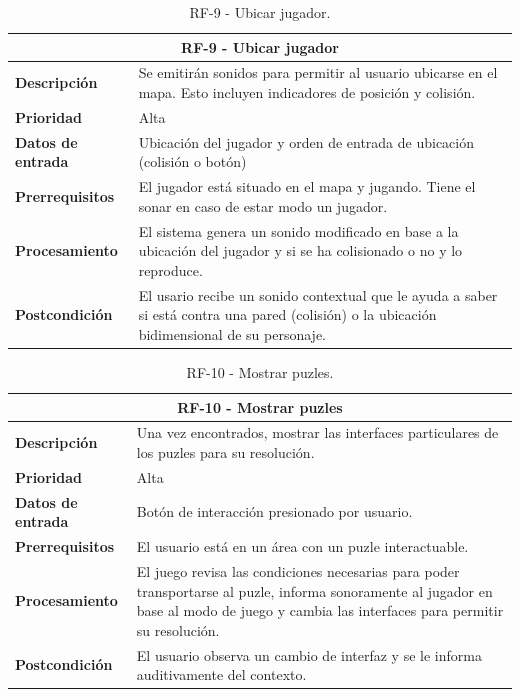 \begin{table}[H]
	\centering
	\caption{RF-9 - Ubicar jugador.}
	\label{table:RF9}
	\begin{tabular}{|l|p{10cm}|}
		\hline
		\multicolumn{2}{|c|}{\textbf{RF-9 - Ubicar jugador}} \\
		\hline
		\textbf{Descripción} &  Se emitirán sonidos para permitir al usuario ubicarse en el mapa. Esto incluyen indicadores de posición y colisión.  \\
		\hline
		\textbf{Prioridad} & Alta \\
		\hline
		\textbf{Datos de entrada} & Ubicación del jugador y orden de entrada de ubicación (colisión o botón) \\
		\hline
		\textbf{Prerrequisitos} & El jugador está situado en el mapa y jugando. Tiene el sonar en caso de estar modo un jugador. \\
		\hline
		\textbf{Procesamiento} & El sistema genera un sonido modificado en base a la ubicación del jugador y si se ha colisionado o no y lo reproduce. \\
		\hline
		\textbf{Postcondición} & El usario recibe un sonido contextual que le ayuda a saber si está contra una pared (colisión) o la ubicación bidimensional de su personaje. \\
		\hline
	\end{tabular}
	
\end{table}
\begin{table}[H]
	\centering
	\caption{RF-10 - Mostrar puzles.}
	\label{table:RF10}
	\begin{tabular}{|l|p{10cm}|}
		\hline
		\multicolumn{2}{|c|}{\textbf{RF-10 - Mostrar puzles}} \\
		\hline
		\textbf{Descripción} & Una vez encontrados, mostrar las interfaces particulares de los puzles para su resolución. \\
		\hline
		\textbf{Prioridad} & Alta \\
		\hline
		\textbf{Datos de entrada} & Botón de interacción presionado por usuario. \\
		\hline
		\textbf{Prerrequisitos} & El usuario está en un área con un puzle interactuable. \\
		\hline
		\textbf{Procesamiento} & El juego revisa las condiciones necesarias para poder transportarse al puzle, informa sonoramente al jugador en base al modo de juego y cambia las interfaces para permitir su resolución. \\
		\hline
		\textbf{Postcondición} & El usuario observa un cambio de interfaz y se le informa auditivamente del contexto. \\
		\hline
	\end{tabular}
	
\end{table}
